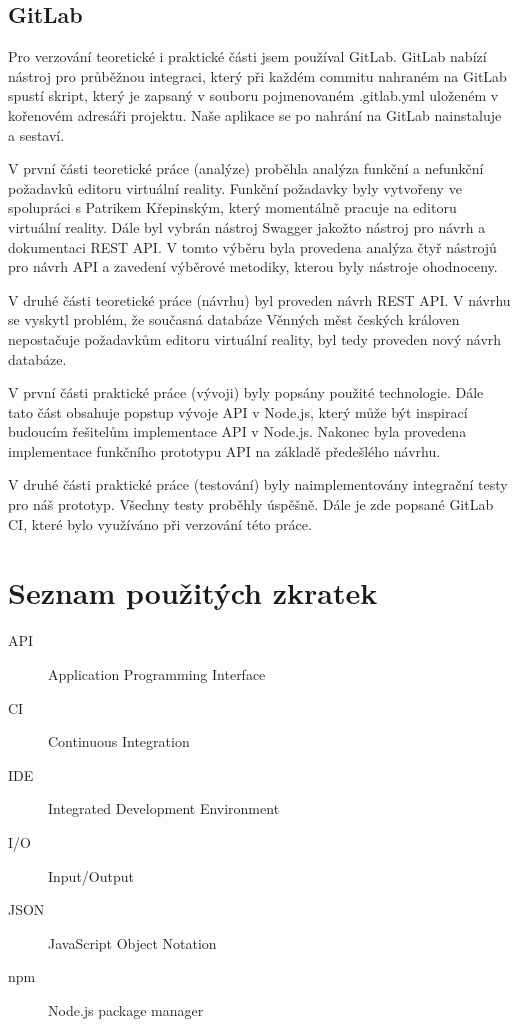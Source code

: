 \documentclass[thesis=B,czech]{FITthesis}[2012/06/26]
\begin{document}
    \section{GitLab}
        Pro verzování teoretické i praktické části jsem používal GitLab. GitLab nabízí nástroj pro průběžnou integraci, který při každém commitu nahraném na GitLab spustí skript, který je zapsaný v souboru pojmenovaném .gitlab.yml uloženém v kořenovém adresáři projektu. Naše aplikace se po nahrání na GitLab nainstaluje a sestaví.

\begin{conclusion}
    V první části teoretické práce (analýze) proběhla analýza funkční a nefunkční požadavků editoru virtuální reality. Funkční požadavky byly vytvořeny ve spolupráci s Patrikem Křepinským, který momentálně pracuje na editoru virtuální reality.
	Dále byl vybrán nástroj Swagger jakožto nástroj pro návrh a dokumentaci REST API. V tomto výběru byla provedena analýza čtyř nástrojů pro návrh API a zavedení výběrové metodiky, kterou byly nástroje ohodnoceny.
	
	
	V druhé části teoretické práce (návrhu) byl proveden návrh REST API. V návrhu se vyskytl problém, že současná databáze Věnných měst českých královen nepostačuje požadavkům editoru virtuální reality, byl tedy proveden nový návrh databáze.
	
	
	V první části praktické práce (vývoji) byly popsány použité technologie. Dále tato část obsahuje popstup vývoje API v Node.js, který může být inspirací budoucím řešitelům implementace API v Node.js. Nakonec byla provedena implementace funkčního prototypu API na základě předešlého návrhu.
	
	
	V druhé části praktické práce (testování) byly naimplementovány integrační testy pro náš prototyp. Všechny testy proběhly úspěšně. Dále je zde popsané GitLab CI, které bylo využíváno při verzování této práce.

\end{conclusion}




\appendix

\chapter{Seznam použitých zkratek}
\begin{description}
	\item[API] Application Programming Interface
	\item[CI] Continuous Integration
	\item[IDE] Integrated Development Environment
	\item[I/O] Input/Output
	\item[JSON] JavaScript Object Notation
	\item[npm] Node.js package manager
\end{description}
\end{document}
